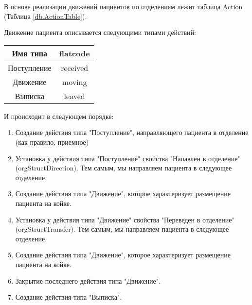 \documentclass[a4paper,8pt]{report} %
\begin{document}
 {\small
 
 В основе реализации движений пациентов по отделениям лежит таблица Action (Таблица \ref{db.ActionTable}).
 {\scriptsize }

 Движение пациента описывается следующими типами действий: \\
 \begin{table}[h]
 \begin{tabular}{|c|c|}
 \hline
 Имя типа & flatcode \\
 \hline
 Поступление & received \\
 Движение & moving \\
 Выписка & leaved \\
 \hline
 \end{tabular}
 \end{table}

 И происходит в следующем порядке:
 \begin{enumerate}
  \item Создание действия типа "Поступление", направляющего пациента в отделение (как правило, приемное)
  \item Установка у действия типа "Поступление" свойства "Напавлен в отделение" (orgStructDirection). Тем самым, мы направляем пациента в следующее отделение.
  \item Создание действия типа "Движение", которое характеризует размещение пациента на койке.
  \item Установка у действия типа "Движение" свойства "Переведен в отделение" (orgStructTransfer). Тем самым, мы направляем пациента в следующее отделение.
  \item Создание действия типа "Движение", которое характеризует размещение пациента на койке.
  \item Закрытие последнего действия типа "Движение".
  \item Создание действия типа "Выписка".
\end{enumerate}
 }
 
\end{document}
